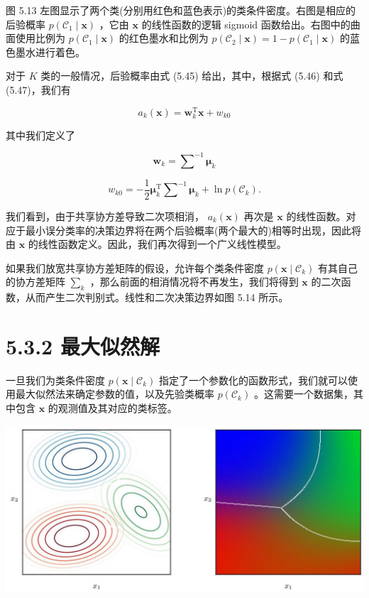\documentclass[10pt]{report}
\begin{document}
图 5.13 左图显示了两个类(分别用红色和蓝色表示)的类条件密度。右图是相应的后验概率 \(p\left( {{\mathcal{C}}_{1} \mid  \mathbf{x}}\right)\) ，它由 \(\mathbf{x}\) 的线性函数的逻辑 sigmoid 函数给出。右图中的曲面使用比例为 \(p\left( {{\mathcal{C}}_{1} \mid  \mathbf{x}}\right)\) 的红色墨水和比例为 \(p\left( {{\mathcal{C}}_{2} \mid  \mathbf{x}}\right)  = 1 - p\left( {{\mathcal{C}}_{1} \mid  \mathbf{x}}\right)\) 的蓝色墨水进行着色。

对于 \(K\) 类的一般情况，后验概率由式 (5.45) 给出，其中，根据式 (5.46) 和式 (5.47)，我们有

\[
{a}_{k}\left( \mathbf{x}\right)  = {\mathbf{w}}_{k}^{\mathrm{T}}\mathbf{x} + {w}_{k0} \tag{5.51}
\]

其中我们定义了

\[
{\mathbf{w}}_{k} = {\mathbf{\sum }}^{-1}{\mathbf{\mu }}_{k} \tag{5.52}
\]

\[
{w}_{k0} =  - \frac{1}{2}{\mathbf{\mu }}_{k}^{\mathrm{T}}{\mathbf{\sum }}^{-1}{\mathbf{\mu }}_{k} + \ln p\left( {\mathcal{C}}_{k}\right) . \tag{5.53}
\]

我们看到，由于共享协方差导致二次项相消， \({a}_{k}\left( \mathbf{x}\right)\) 再次是 \(\mathbf{x}\) 的线性函数。对应于最小误分类率的决策边界将在两个后验概率(两个最大的)相等时出现，因此将由 \(\mathbf{x}\) 的线性函数定义。因此，我们再次得到一个广义线性模型。

如果我们放宽共享协方差矩阵的假设，允许每个类条件密度 \(p\left( {\mathbf{x} \mid  {\mathcal{C}}_{k}}\right)\) 有其自己的协方差矩阵 \({\mathbf{\sum }}_{k}\) ，那么前面的相消情况将不再发生，我们将得到 \(\mathbf{x}\) 的二次函数，从而产生二次判别式。线性和二次决策边界如图 5.14 所示。

\section*{5.3.2 最大似然解}

一旦我们为类条件密度 \(p\left( {\mathbf{x} \mid  {\mathcal{C}}_{k}}\right)\) 指定了一个参数化的函数形式，我们就可以使用最大似然法来确定参数的值，以及先验类概率 \(p\left( {\mathcal{C}}_{k}\right)\) 。这需要一个数据集，其中包含 \(\mathbf{x}\) 的观测值及其对应的类标签。

\begin{center}
\includegraphics[max width=1.0\textwidth]{images/0194e279-9b28-703a-88f4-c3ac21e2010d_173_240_343_1308_611_0.jpg}
\end{center}
\hspace*{3em} 
\end{document}
